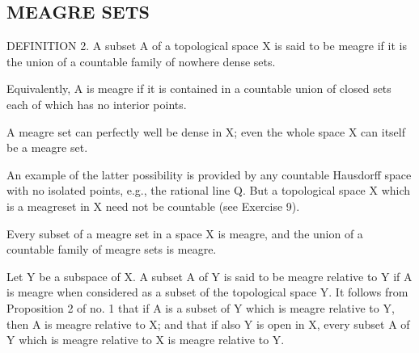 \subsection{MEAGRE SETS}

DEFINITION 2. A subset A of a topological space X is said to be meagre if it is the union of a countable family of nowhere dense sets.

Equivalently, A is meagre if it is contained in a countable union of closed sets each of which has no interior points.

A meagre set can perfectly well be dense in X; even the whole space X can itself be a meagre set.

An example of the latter possibility is provided by any countable Hausdorff space with no isolated points, e.g., the rational line Q. But a topological space X which is a meagreset in X need not be countable (see Exercise 9).

Every subset of a meagre set in a space X is meagre, and the union of a countable family of meagre sets is meagre.

Let Y be a subspace of X. A subset A of Y is said to be meagre relative to Y if A is meagre when considered as a subset of the topological space Y. It follows from Proposition 2 of no. 1 that if A is a subset of Y which is meagre relative to Y, then A is meagre relative to X; and that if also Y is open in X, every subset A of Y which is meagre relative to X is meagre relative to Y.

